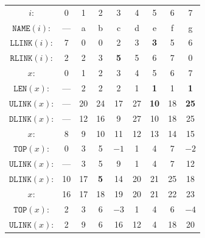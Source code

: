 \documentclass[a4paper,landscape,11pt]{article}
\begin{document}
\begin{figure}[H]
	\centering

	\begin{minipage}[t]{0.48\linewidth}
		\centering
		\begin{tabular}{c c c c c c c c c}
			\hline
			$i$:                 & 0   & 1          & 2          & 3          & 4  & 5           & 6    & 7           \\
			$\texttt{NAME}(i)$:  & --- & a          & b          & c          & d  & e           & f    & g           \\
			$\texttt{LLINK}(i)$: & 7   & 0          & 0          & 2          & 3  & \textbf{3}  & 5    & 6           \\
			$\texttt{RLINK}(i)$: & 2   & 2          & 3          & \textbf{5} & 5  & 6           & 7    & 0           \\
			\hline
			$x$:                 & 0   & 1          & 2          & 3          & 4  & 5           & 6    & 7           \\
			$\texttt{LEN}(x)$:   & --- & 2          & 2          & 2          & 1  & \textbf{1}  & 1    & \textbf{1}  \\
			$\texttt{ULINK}(x)$: & --- & 20         & 24         & 17         & 27 & \textbf{10} & 18   & \textbf{25} \\
			$\texttt{DLINK}(x)$: & --- & 12         & 16         & 9          & 27 & 10          & 18   & 25          \\
			\hline
			$x$:                 & 8   & 9          & 10         & 11         & 12 & 13          & 14   & 15          \\
			$\texttt{TOP}(x)$:   & 0   & 3          & 5          & $-1$       & 1  & 4           & 7    & $-2$        \\
			$\texttt{ULINK}(x)$: & --- & 3          & 5          & 9          & 1  & 4           & 7    & 12          \\
			$\texttt{DLINK}(x)$: & 10  & 17         & \textbf{5} & 14         & 20 & 21          & 25   & 18          \\
			\hline
			$x$:                 & 16  & 17         & 18         & 19         & 20 & 21          & 22   & 23          \\
			$\texttt{TOP}(x)$:   & 2   & 3          & 6          & $-3$       & 1  & 4           & 6    & $-4$        \\
			$\texttt{ULINK}(x)$: & 2   & 9          & 6          & 16         & 12 & 4           & 18   & 20          \\

\end{tabular}
\end{minipage}
\end{figure}
\end{document}

